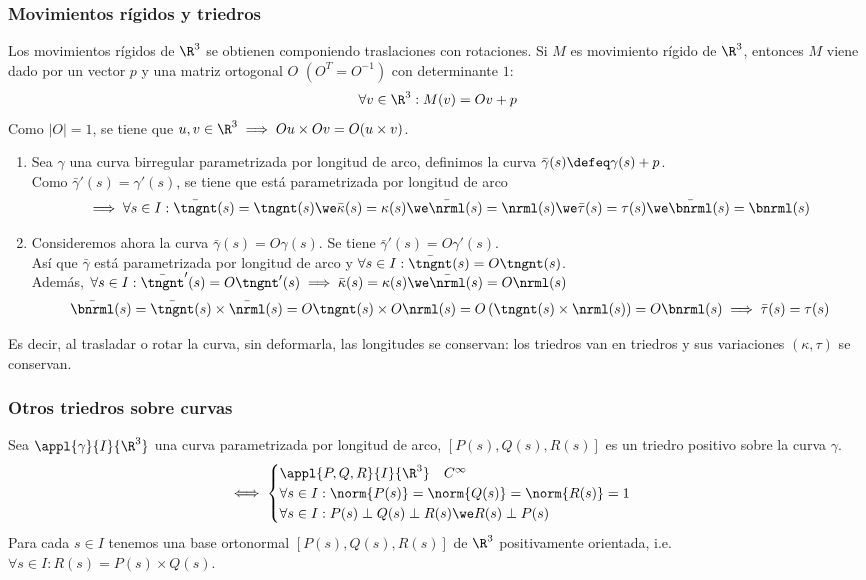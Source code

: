 \subsubsection{Movimientos rígidos y triedros}
Los movimientos rígidos de $\R^3$ se obtienen componiendo traslaciones con rotaciones. Si $M$ es movimiento rígido de $\R^3$, entonces $M$ viene dado por un vector $p$ y una matriz ortogonal $O$ $\left(O^T=O^{-1}\right)$ con determinante $1$:
\[\forall v \in \R^3 : M(v)=Ov+p\]
Como $|O|=1$, se tiene que $u, v \in \R^3 \implies Ou\times Ov=O(u\times v)$.
\begin{enumerate}
	\item {} Sea $\gamma$ una curva birregular parametrizada por longitud de arco, definimos la curva $\bar{\gamma}(s)\defeq\gamma(s)+p$. \\
	      Como $\bar{\gamma}'(s)=\gamma'(s)$, se tiene que está parametrizada por longitud de arco \[\implies \forall s \in I : \bar{\tngnt}(s) = \tngnt(s) \we \bar{\kappa}(s)=\kappa(s) \we \bar{\nrml}(s)=\nrml(s) \we \bar{\tau}(s)=\tau(s) \we \bar{\bnrml}(s)=\bnrml(s)\]
	\item {} Consideremos ahora la curva $\bar{\gamma}(s)=O\gamma(s)$. Se tiene $\bar{\gamma}'(s)=O\gamma'(s)$. \\Así que $\bar{\gamma}$ está parametrizada por longitud de arco y $\forall s \in I : \bar{\tngnt}(s)=O\tngnt(s)$.\\
	      Además, $\forall s \in I : \bar{\tngnt}'(s)=O\tngnt'(s) \implies \bar{\kappa}(s)=\kappa(s) \we \bar{\nrml}(s)=O\nrml(s)$
	      \[\bar{\bnrml}(s)=\bar{\tngnt}(s)\times\bar{\nrml}(s) = O\tngnt(s)\times O\nrml(s)=O\left(\tngnt(s)\times \nrml(s)\right)=O\bnrml(s) \implies \bar{\tau}(s)=\tau(s)\]
\end{enumerate}
Es decir, al trasladar o rotar la curva, sin deformarla, las longitudes se conservan: los triedros van en triedros y sus variaciones $(\kappa, \tau)$ se conservan.

\subsubsection{Otros triedros sobre curvas}

\begin{defn}
	Sea $\appl{\gamma}{I}{\R^3}$ una curva parametrizada por longitud de arco, $\left[P(s), Q(s), R(s)\right]$ es un triedro positivo sobre la curva $\gamma$.
	\[\iff \begin{cases}
			\appl{P, Q, R}{I}{\R^3} \quad C^\infty                  \\
			\forall s \in I : \norm{P(s)}=\norm{Q(s)}=\norm{R(s)}=1 \\
			\forall s \in I : P(s) \perp Q(s) \perp R(s) \we R(s) \perp P(s)
		\end{cases}\]
	Para cada $s \in I$ tenemos una base ortonormal $[P(s), Q(s), R(s)]$ de $\R^3$ positivamente orientada, i.e. $\forall s \in I : R(s)=P(s)\times Q(s)$.
\end{defn}

